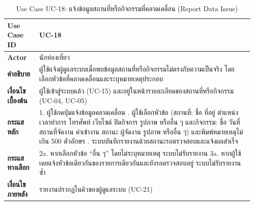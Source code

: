 \begin{table}[H]
\centering
\caption{Use Case UC-18: แจ้งข้อมูลสถานที่หรือกิจกรรมที่คลาดเคลื่อน (Report Data Issue)}
\label{tab:uc18}
\begin{tabular}{|p{3.2cm}|p{10cm}|}
\hline
\textbf{Use Case ID} & UC-18 \\ \hline
\textbf{Actor} & นักท่องเที่ยว \\ \hline
\textbf{คำอธิบาย} & ผู้ใช้แจ้งผู้ดูแลระบบเมื่อพบข้อมูลสถานที่หรือกิจกรรมไม่ตรงกับความเป็นจริง โดยเลือกหัวข้อที่คลาดเคลื่อนและระบุหมายเหตุประกอบ \\ \hline
\textbf{เงื่อนไขเบื้องต้น} & ผู้ใช้เข้าสู่ระบบแล้ว (UC-15) และอยู่ในหน้ารายละเอียดของสถานที่หรือกิจกรรม (UC-04, UC-05) \\ \hline
\textbf{กระแสหลัก} & 1. ผู้ใช้กดปุ่มแจ้งข้อมูลคลาดเคลื่อน \newline 2. ผู้ใช้เลือกหัวข้อ (สถานที่: ชื่อ ที่อยู่ ตำแหน่ง เวลาทำการ โทรศัพท์ เว็บไซต์ ปิดกิจการ รูปภาพ หรืออื่น ๆ และกิจกรรม: ชื่อ วันที่ สถานที่จัดงาน ค่าเข้างาน สถานะ ผู้จัดงาน รูปภาพ หรืออื่น ๆ) และพิมพ์หมายเหตุไม่เกิน 500 ตัวอักษร \newline 3. ระบบบันทึกรายงานด้วยสถานะรอตรวจสอบและแจ้งผลสำเร็จ \\ \hline
\textbf{กระแสทางเลือก} & 2a. หากเลือกหัวข้อ ``อื่น ๆ'' โดยไม่ระบุหมายเหตุ ระบบไม่รับรายงาน \newline 3a. หากผู้ใช้เคยแจ้งหัวข้อเดียวกันของรายการเดียวกันและยังรอตรวจสอบอยู่ ระบบไม่รับรายงานซ้ำ \\ \hline
\textbf{เงื่อนไขภายหลัง} & รายงานปรากฏในคิวของผู้ดูแลระบบ (UC-21) \\
\hline
\end{tabular}
\end{table}

